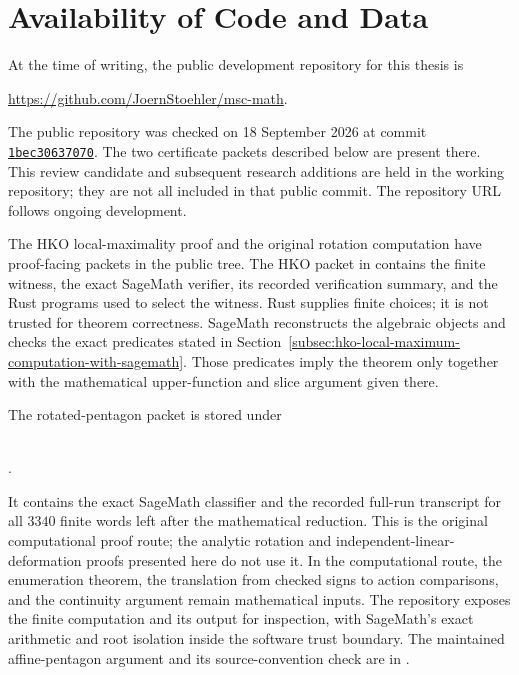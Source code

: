 \section{Availability of Code and Data}\label{sec:published-code-data}

At the time of writing, the public development repository for this thesis is
\begin{center}
  \url{https://github.com/JoernStoehler/msc-math}.
\end{center}
The public repository was checked on 18 September 2026 at commit
\href{https://github.com/JoernStoehler/msc-math/tree/1bec30637070effe7ab8b0a022ae62e83f6bbcab}{\texttt{1bec30637070}}. The two certificate
packets described below are present there. This review candidate and subsequent
research additions are held in the working repository; they are not all included
in that public commit. The repository URL follows ongoing development.

The HKO local-maximality proof and the original rotation computation have
proof-facing packets in the public tree.  The HKO packet in
 contains the finite witness, the
exact SageMath verifier, its recorded verification summary, and the Rust
programs used to select the witness.  Rust supplies finite choices; it is not
trusted for theorem correctness.  SageMath reconstructs the algebraic objects
and checks the exact predicates stated in
Section~\ref{subsec:hko-local-maximum-computation-with-sagemath}.  Those
predicates imply the theorem only together with the mathematical
upper-function and slice argument given there.

The rotated-pentagon packet is stored under
\begin{center}
  \small{}\\[-0.2em]
  .
\end{center}
It contains the exact SageMath classifier and the recorded full-run transcript
for all \(3340\) finite words left after the mathematical reduction.  This is the original computational proof route; the analytic rotation and
independent-linear-deformation proofs presented here do not use it. In the
computational route, the enumeration theorem, the
translation from checked signs to action comparisons, and the continuity
argument remain mathematical inputs.  The repository exposes the finite
computation and its output for inspection, with SageMath's exact arithmetic
and root isolation inside the software trust boundary. The maintained
affine-pentagon argument and its source-convention check are in
.


